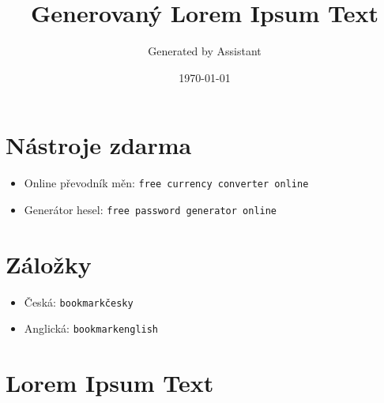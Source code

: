 \documentclass[a4paper, 12pt]{article}
\title{Generovaný Lorem Ipsum Text}
\author{Generated by Assistant}
\date{\today}
\begin{document}
\maketitle

\section*{Nástroje zdarma}
\begin{itemize}
    \item Online převodník měn: \texttt{free currency converter online}
    \item Generátor hesel: \texttt{free password generator online}
\end{itemize}

\section*{Záložky}
\begin{itemize}
    \item Česká: \texttt{bookmarkčesky}
    \item Anglická: \texttt{bookmarkenglish}
\end{itemize}

\section*{Lorem Ipsum Text}
\end{document}
